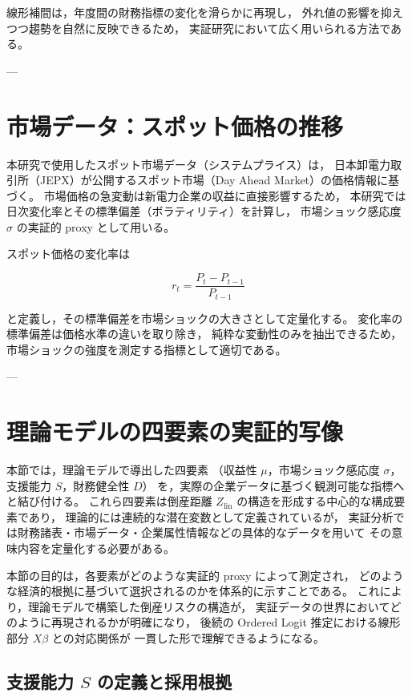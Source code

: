 線形補間は，年度間の財務指標の変化を滑らかに再現し，
外れ値の影響を抑えつつ趨勢を自然に反映できるため，
実証研究において広く用いられる方法である。

---

\section{市場データ：スポット価格の推移}

本研究で使用したスポット市場データ（システムプライス）は，
日本卸電力取引所（JEPX）が公開するスポット市場（Day Ahead Market）の価格情報に基づく。
市場価格の急変動は新電力企業の収益に直接影響するため，
本研究では日次変化率とその標準偏差（ボラティリティ）を計算し，
市場ショック感応度 $\sigma$ の実証的 proxy として用いる。

スポット価格の変化率は



\[
r_t = \frac{P_t - P_{t-1}}{P_{t-1}}
\]



と定義し，その標準偏差を市場ショックの大きさとして定量化する。
変化率の標準偏差は価格水準の違いを取り除き，
純粋な変動性のみを抽出できるため，市場ショックの強度を測定する指標として適切である。

---

\section{理論モデルの四要素の実証的写像}

本節では，理論モデルで導出した四要素
（収益性 $\mu$，市場ショック感応度 $\sigma$，支援能力 $S$，財務健全性 $D$）
を，実際の企業データに基づく観測可能な指標へと結び付ける。
これら四要素は倒産距離 $Z_{\text{lin}}$ の構造を形成する中心的な構成要素であり，
理論的には連続的な潜在変数として定義されているが，
実証分析では財務諸表・市場データ・企業属性情報などの具体的なデータを用いて
その意味内容を定量化する必要がある。

本節の目的は，各要素がどのような実証的 proxy によって測定され，
どのような経済的根拠に基づいて選択されるのかを体系的に示すことである。
これにより，理論モデルで構築した倒産リスクの構造が，
実証データの世界においてどのように再現されるかが明確になり，
後続の Ordered Logit 推定における線形部分 $X\beta$ との対応関係が
一貫した形で理解できるようになる。


\subsection{支援能力 $S$ の定義と採用根拠}

